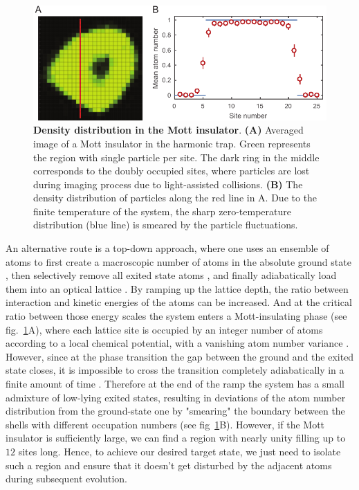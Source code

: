 \begin{figure}[t]
	\centering
	\includegraphics[scale=1]{figures/CTE_MI.pdf}
	\caption{{\bf Density distribution in the Mott insulator}. {\bf (A)} Averaged image of a Mott insulator in the harmonic trap. Green represents the region with single particle per site. The dark ring in the middle corresponds to the doubly occupied sites, where particles are lost during imaging process due to light-assisted collisions. {\bf (B)} The density distribution of particles along the red line in A. Due to the finite temperature of the system, the sharp zero-temperature distribution (blue line) is smeared by the particle fluctuations.}
	\label{fig:CTE_MI}
\end{figure}

An alternative route is a top-down approach, where one uses an ensemble of atoms to first create a macroscopic number of atoms in the absolute ground state \cite{Anderson1995, Regal2004}, then selectively remove all exited state atoms \cite{PengThesis}, and finally adiabatically load them into an optical lattice \cite{Greiner2002}. By ramping up the lattice depth, the ratio between interaction and kinetic energies of the atoms can be increased. And at the critical ratio between those energy scales the system enters a Mott-insulating phase (see fig.~\ref{fig:CTE_MI}A), where each lattice site is occupied by an integer number of atoms according to a local chemical potential, with a vanishing atom number variance \cite{Bakr2010, Sherson2010}. However, since at the phase transition the gap between the ground and the exited state closes, it is impossible to cross the transition completely adiabatically in a finite amount of time \cite{Sachdev2011}. Therefore at the end of the ramp the system has a small admixture of low-lying exited states, resulting in  deviations of the atom number distribution from the ground-state one by "smearing" the boundary between the shells with different occupation numbers (see fig~\ref{fig:CTE_MI}B). However, if the Mott insulator is sufficiently large, we can find a region with nearly unity filling up to $12$ sites long. Hence, to achieve our desired target state, we just need to isolate such a region and ensure that it doesn't get disturbed by the adjacent atoms during subsequent evolution.

